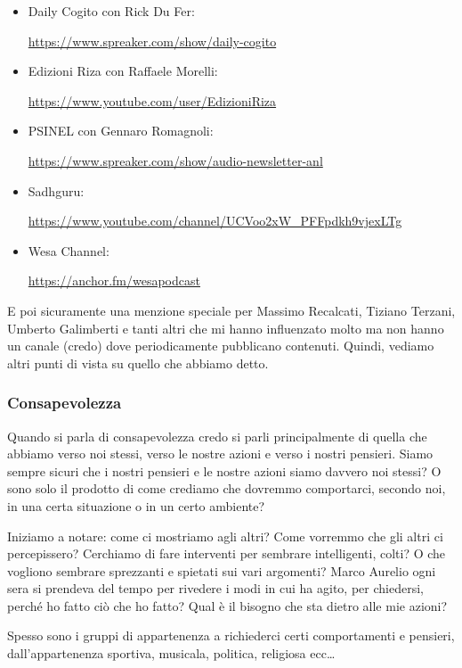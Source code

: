 \documentclass[12pt]{book} %
\begin{document}
\begin{itemize}
\item Daily Cogito con Rick Du Fer: \raggedright\url{https://www.spreaker.com/show/daily-cogito} 
\item Edizioni Riza con Raffaele Morelli: \raggedright\url{https://www.youtube.com/user/EdizioniRiza}
\item PSINEL con Gennaro Romagnoli: \raggedright\url{https://www.spreaker.com/show/audio-newsletter-anl} 
\item Sadhguru: \raggedright\url{https://www.youtube.com/channel/UCVoo2xW\_PFFpdkh9vjexLTg} 
\item Wesa Channel: \raggedright\url{https://anchor.fm/wesapodcast} 
\end{itemize}
E poi sicuramente una menzione speciale per Massimo Recalcati, Tiziano Terzani, Umberto Galimberti e tanti altri che mi
hanno influenzato molto ma non hanno un canale (credo) dove periodicamente pubblicano contenuti. Quindi, vediamo altri
punti di vista su quello che abbiamo detto.

\subsubsection{Consapevolezza}
Quando si parla di consapevolezza credo si parli principalmente di quella che abbiamo verso noi stessi, verso le nostre azioni e
verso i nostri pensieri. Siamo sempre sicuri che i nostri pensieri e le nostre azioni siamo davvero noi stessi? O sono
solo il prodotto di come crediamo che dovremmo comportarci, secondo noi, in una certa situazione o in un certo ambiente? 

Iniziamo a notare: come ci mostriamo agli altri? Come vorremmo che gli altri ci percepissero? Cerchiamo di fare
interventi per sembrare intelligenti, colti? O che vogliono sembrare sprezzanti e spietati sui vari argomenti? Marco
Aurelio ogni sera si prendeva del tempo per rivedere i modi in cui ha agito, per chiedersi, perché ho fatto ciò che ho
fatto? Qual è il bisogno che sta dietro alle mie azioni? 

Spesso sono i gruppi di appartenenza a richiederci certi comportamenti e pensieri,
dall'appartenenza sportiva, musicala, politica, religiosa ecc…
\end{document}
